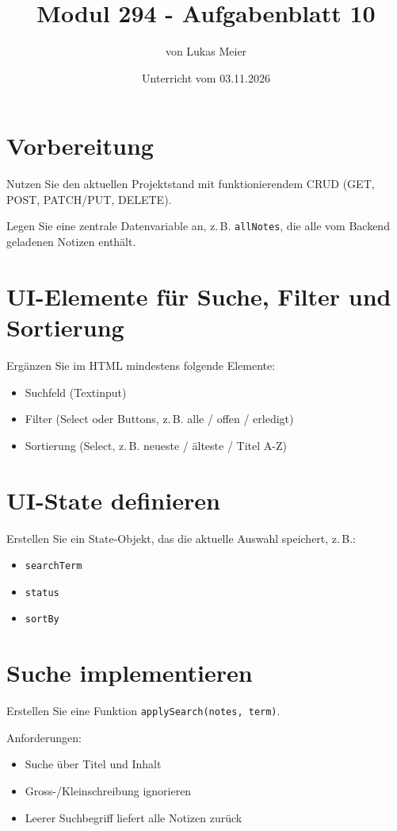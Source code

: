\documentclass[a4paper,12pt]{article}
\title{Modul 294 - Aufgabenblatt 10}
\author{von Lukas Meier}
\date{Unterricht vom 03.11.2026}
\begin{document}
\maketitle

\section{Vorbereitung}

Nutzen Sie den aktuellen Projektstand mit funktionierendem CRUD (GET, POST, PATCH/PUT, DELETE).

Legen Sie eine zentrale Datenvariable an, z.\,B. \texttt{allNotes}, die alle vom Backend geladenen Notizen enthält.

\section{UI-Elemente für Suche, Filter und Sortierung}

Ergänzen Sie im HTML mindestens folgende Elemente:
\begin{itemize}
    \item Suchfeld (Textinput)
    \item Filter (Select oder Buttons, z.\,B. alle / offen / erledigt)
    \item Sortierung (Select, z.\,B. neueste / älteste / Titel A-Z)
\end{itemize}

\section{UI-State definieren}

Erstellen Sie ein State-Objekt, das die aktuelle Auswahl speichert, z.\,B.:
\begin{itemize}
    \item \texttt{searchTerm}
    \item \texttt{status}
    \item \texttt{sortBy}
\end{itemize}

\section{Suche implementieren}

Erstellen Sie eine Funktion \texttt{applySearch(notes, term)}.

Anforderungen:
\begin{itemize}
    \item Suche über Titel und Inhalt
    \item Gross-/Kleinschreibung ignorieren
    \item Leerer Suchbegriff liefert alle Notizen zurück
\end{itemize}
\end{document}
